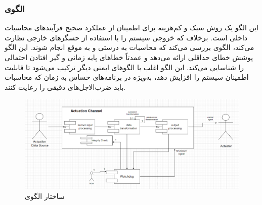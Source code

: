 \subsubsection{الگوی }
\label{archSafeWatchDogSec}
\begin{RTL}
این الگو \cite{ref4}
یک روش سبک و کم‌هزینه برای اطمینان از عملکرد صحیح فرآیندهای
محاسبات داخلی است. برخلاف 
که خروجی سیستم را با استفاده از حسگرهای خارجی نظارت می‌کند،
الگوی  بررسی می‌کند که محاسبات
به درستی و به موقع انجام شوند. این الگو پوشش خطای حداقلی ارائه می‌دهد
و عمدتاً خطاهای پایه زمانی و گیر افتادن احتمالی را شناسایی می‌کند.
این الگو اغلب با الگوهای ایمنی دیگر ترکیب می‌شود تا قابلیت اطمینان سیستم
را افزایش دهد، به‌ویژه در برنامه‌های حساس به زمان که محاسبات
باید ضرب‌الاجل‌های دقیقی را رعایت کنند.
\end{RTL}
\begin{figure}[h!]
\centering
\includegraphics[scale=0.5]{images/third/watchdog.png}
\caption{ساختار الگوی }
\end{figure}
